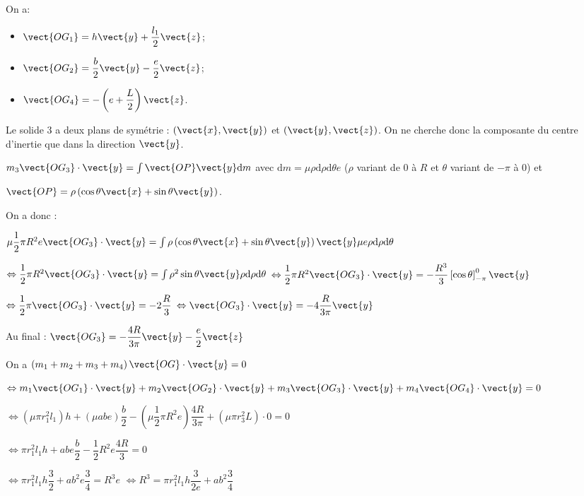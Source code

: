 \ifprof \begin{corrige}
On a: 
\begin{itemize}
\item $\vect{OG_1} = h\vect{y}+\dfrac{l_1}{2}\vect{z}$;
\item $\vect{OG_2} = \dfrac{b}{2}\vect{y}-\dfrac{e}{2}\vect{z}$;
\item $\vect{OG_4} = -\left(e+\dfrac{L}{2}\right)\vect{z}$.
\end{itemize}

Le solide 3 a deux plans de symétrie : $\left(\vect{x},\vect{y}\right)$ et $\left(\vect{y},\vect{z}\right)$. On ne cherche donc la composante du centre d'inertie que dans la direction $\vect{y}$.

$m_3 \vect{OG_3}\cdot \vect{y} = \int \vect{OP}\vect{y} \text{d}m$ avec $\text{d}m=\mu \rho \text{d}\rho\text{d}\theta e $ ($\rho$ variant de 0 à $R$ et $\theta$ variant de $-\pi$ à 0) et 

$\vect{OP}=\rho\left( \cos\theta \vect{x}+ \sin\theta \vect{y}\right)$. 

On a donc : 

$ \mu \dfrac{1}{2}\pi R^2 e \vect{OG_3}\cdot \vect{y} = \int \rho\left( \cos\theta \vect{x}+ \sin\theta \vect{y}\right) \vect{y} \mu e\rho \text{d}\rho\text{d}\theta $

$ \Leftrightarrow \dfrac{1}{2}\pi R^2  \vect{OG_3}\cdot \vect{y} = \int \rho^2 \sin\theta  \vect{y} \rho \text{d}\rho\text{d}\theta $
$ \Leftrightarrow \dfrac{1}{2}\pi R^2  \vect{OG_3}\cdot \vect{y} = -\dfrac{R^3}{3}  \left[\cos\theta \right]_{-\pi}^0  \vect{y}$

$ \Leftrightarrow \dfrac{1}{2}\pi  \vect{OG_3}\cdot \vect{y} = -2\dfrac{R}{3}  $
$ \Leftrightarrow  \vect{OG_3}\cdot \vect{y} = -4\dfrac{R}{3\pi}  \vect{y} $

Au final : 
$\vect{OG_3} = -\dfrac{4R}{3\pi}  \vect{y}-\dfrac{e}{2}\vect{z}$
\end{corrige}\else\fi


\ifprof \begin{corrige}
On a $\left( m_1+m_2+m_3+m_4\right) \vect{OG}\cdot \vect{y}=0 $

$\Leftrightarrow m_1 \vect{OG_1}\cdot \vect{y}+m_2 \vect{OG_2}\cdot \vect{y}+m_3 \vect{OG_3}\cdot \vect{y}+m_4 \vect{OG_4}\cdot \vect{y} = 0$

$\Leftrightarrow \left(\mu \pi r_1^2 l_1\right) h+\left(\mu a b e\right) \dfrac{b}{2}-\left(\mu \dfrac{1}{2}\pi R^2 e\right) \dfrac{4R}{3\pi} +\left(\mu \pi r_3^2L\right) \cdot 0 = 0$


$\Leftrightarrow  \pi r_1^2 l_1 h+a b e \dfrac{b}{2}- \dfrac{1}{2} R^2 e \dfrac{4R}{3}  = 0$

$\Leftrightarrow  \pi r_1^2 l_1 h\dfrac{3}{2}+a b^2 e \dfrac{3}{4}=  R^3 e  $
$\Leftrightarrow   R^3 = \pi r_1^2 l_1 h\dfrac{3}{2e}+a b^2 \dfrac{3}{4}    $
\end{corrige}\else\fi

